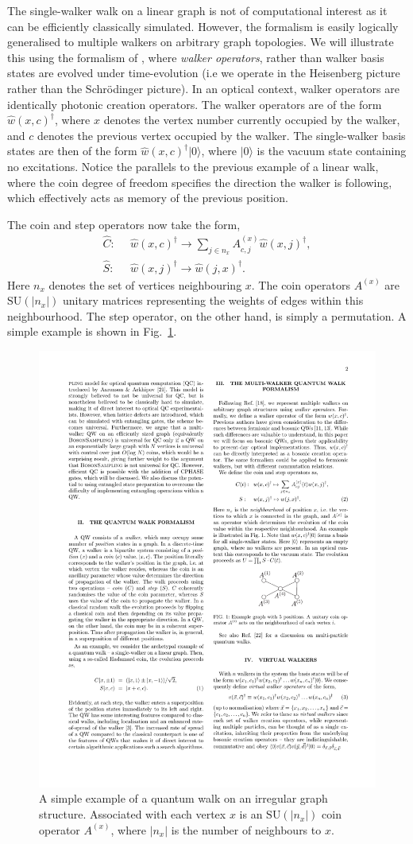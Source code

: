 \documentclass[aps,rmp,twocolumn,amsmath,amssymb,nofootinbib,superscriptaddress,longbibliography,floatfix,table-of-contents,eqsecnum]{revtex4-1}
\newcommand{\ket}[1]{|#1\rangle}
\begin{document}
The single-walker walk on a linear graph is not of computational interest as it can be efficiently classically simulated. However, the formalism is easily logically generalised to multiple walkers on arbitrary graph topologies. We will illustrate this using the formalism of \cite{bib:RohdeMultiWalk11}, where \textit{walker operators}, rather than walker basis states are evolved under time-evolution (i.e we operate in the Heisenberg picture rather than the Schr{\" o}dinger picture). In an optical context, walker operators are identically photonic creation operators. The walker operators are of the form $\hat{w}(x,c)^\dag$, where $x$ denotes the vertex number currently occupied by the walker, and $c$ denotes the previous vertex occupied by the walker. The single-walker basis states are then of the form $\hat{w}(x,c)^\dag\ket{0}$, where $\ket{0}$ is the vacuum state containing no excitations. Notice the parallels to the previous example of a linear walk, where the coin degree of freedom specifies the direction the walker is following, which effectively acts as memory of the previous position.

The coin and step operators now take the form,
\begin{align}
\hat{C}: \,\,\, &\hat{w}(x,c)^\dag \to \sum_{j\in n_x}A_{c,j}^{(x)} \hat{w}(x,j)^\dag, \nonumber \\
\hat{S}: \,\,\, &\hat{w}(x,j)^\dag \to \hat{w}(j,x)^\dag.
\end{align}
Here $n_x$ denotes the set of vertices neighbouring $x$. The coin operators $A^{(x)}$ are \mbox{$\text{SU}(|n_x|)$} unitary matrices representing the weights of edges within this neighbourhood. The step operator, on the other hand, is simply a permutation. A simple example is shown in Fig.~\ref{fig:QW_arbitrary_graph}.

\begin{figure}[!htb]
\includegraphics[width=0.4\columnwidth]{QW_arbitrary_graph}
\caption{A simple example of a quantum walk on an irregular graph structure. Associated with each vertex $x$ is an $\text{SU}(|n_x|)$ coin operator $A^{(x)}$, where $|n_x|$ is the number of neighbours to $x$.} \label{fig:QW_arbitrary_graph}
\end{figure}
\end{document}
